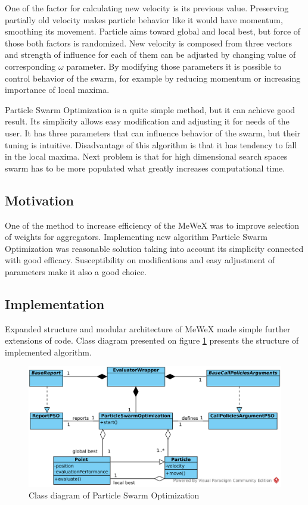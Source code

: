 One of the factor for calculating new velocity is its previous value. Preserving partially old velocity makes particle behavior 
like it would have momentum, smoothing its movement. Particle aims toward global and local best, but force of those both factors is randomized.
New velocity is composed from three vectors and strength of influence for each of them can be adjusted by changing value 
of corresponding \(\omega\) parameter. By modifying those parameters it is possible to control behavior of the swarm, for example 
by reducing momentum or increasing importance of local maxima.

Particle Swarm Optimization is a quite simple method, but it can achieve good result. Its simplicity allows easy modification and adjusting 
it for needs of the user. It has three parameters that can influence behavior of the swarm, but their tuning is intuitive. 
Disadvantage of this algorithm is that it has tendency to fall in the local maxima. Next problem is that for high dimensional search spaces 
swarm has to be more populated what greatly increases computational time. 

\subsection{Motivation}
One of the method to increase efficiency of the MeWeX was to improve selection of weights for aggregators. 
Implementing new algorithm Particle Swarm Optimization was reasonable solution taking into account its simplicity 
connected with good efficacy. Susceptibility on modifications and easy adjustment of parameters make it also a good choice.

\subsection{Implementation}
Expanded structure and modular architecture of MeWeX made simple further extensions of code. Class diagram presented on figure \ref{img_pso_class}
presents the structure of implemented algorithm.
\begin{figure}[ht]
\centering
    \includegraphics[scale=0.2]{img/pso_class.png}
    \caption{Class diagram of Particle Swarm Optimization}
    \label{img_pso_class}
\end{figure}


